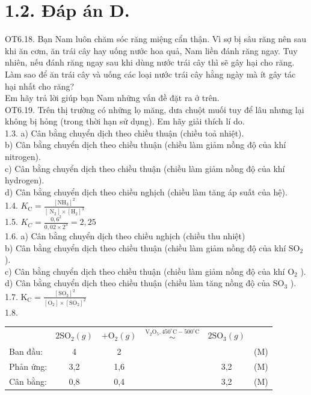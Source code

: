 \documentclass[10pt]{article}
\begin{document}
\section*{1.2. Đáp án D.}
OT6.18. Bạn Nam luôn chăm sóc răng miệng cẩn thận. Vì sợ bị sâu răng nên sau khi ăn cơm, ăn trái cây hay uống nước hoa quả, Nam liền đánh răng ngay. Tuy nhiên, nếu đánh răng ngay sau khi dùng nước trái cây thì sẽ gây hại cho răng. Làm sao để ăn trái cây và uống các loại nước trái cây hằng ngày mà ít gây tác hại nhất cho răng?\\
Em hãy trả lời giúp bạn Nam những vấn đề đặt ra ở trên.\\
OT6.19. Trên thị trường có những lọ măng, dưa chuột muối tuy để lâu nhưng lại không bị hỏng (trong thời hạn sử dụng). Em hãy giải thích lí do.\\
1.3. a) Cân bằng chuyển dịch theo chiều thuận (chiều toả nhiệt).\\
b) Cân bằng chuyển dịch theo chiều thuận (chiều làm giảm nồng độ của khí nitrogen).\\
c) Cân bằng chuyển dịch theo chiều thuận (chiều làm giảm nồng độ của khí hydrogen).\\
d) Cân bằng chuyển dịch theo chiều nghịch (chiều làm tăng áp suất của hệ).\\
1.4. $K_{\mathrm{C}}=\frac{\left[\mathrm{NH}_{3}\right]^{2}}{\left[\mathrm{~N}_{2}\right] \times\left[\mathrm{H}_{2}\right]^{3}}$\\
1.5. $K_{C}=\frac{0,6^{2}}{0,02 \times 2^{3}}=2,25$\\
1.6. a) Cân bằng chuyển dịch theo chiều nghịch (chiều thu nhiệt)\\
b) Cân bằng chuyển dịch theo chiều thuận (chiều làm giảm nồng độ của khí $\mathrm{SO}_{2}$ ).\\
c) Cân bằng chuyển dịch theo chiều thuận (chiều làm giảm nồng độ của khí $\mathrm{O}_{2}$ ).\\
d) Cân bằng chuyển dịch theo chiều thuận (chiều làm tăng nồng độ của $\mathrm{SO}_{3}$ ).\\
1.7. $\mathrm{K}_{\mathrm{C}}=\frac{\left[\mathrm{SO}_{3}\right]^{2}}{\left[\mathrm{O}_{2}\right] \times\left[\mathrm{SO}_{2}\right]^{2}}$\\
1.8.

\begin{center}
\begin{tabular}{lccccc}
 & $2 \mathrm{SO}_{2}(g)$ & $+\mathrm{O}_{2}(g)$ & $\stackrel{\mathrm{V}_{2} \mathrm{O}_{5}, 450^{\circ} \mathrm{C}-500^{\circ} \mathrm{C}}{\sim}$ & $2 \mathrm{SO}_{3}(g)$ &  \\
Ban đầu: & 4 & 2 &  &  & (M) \\
Phản ứng: & 3,2 & 1,6 &  & 3,2 & (M) \\
Cân bằng: & 0,8 & 0,4 &  & 3,2 & (M) \\
\end{tabular}
\end{center}
\end{document}
